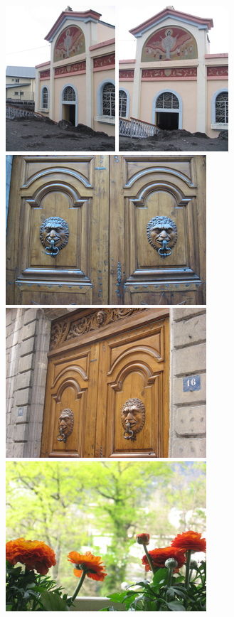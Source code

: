 \documentclass[twocolumn]{article}
\begin{document}
\begin{figure}
			\resizebox{1.95\columnwidth}{!}
			{
				\includegraphics[scale=0.82]{inria1.jpg}
				\includegraphics[scale=0.82]{inria2.jpg}
				\includegraphics[scale=0.82]{inria3.jpg}
				\includegraphics[scale=0.82]{inria4.jpg}
				\includegraphics[scale=0.82]{inria5.jpg}
}
\end{figure}
\end{document}
